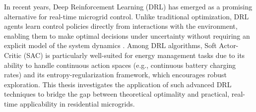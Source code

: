 In recent years, Deep Reinforcement Learning (DRL) has emerged as a promising alternative for real-time microgrid control. Unlike traditional optimization, DRL agents learn control policies directly from interactions with the environment, enabling them to make optimal decisions under uncertainty without requiring an explicit model of the system dynamics \cite{Mocanu2018, Li2019}. Among DRL algorithms, Soft Actor-Critic (SAC) \cite{Haarnoja2018} is particularly well-suited for energy management tasks due to its ability to handle continuous action spaces (e.g., continuous battery charging rates) and its entropy-regularization framework, which encourages robust exploration. This thesis investigates the application of such advanced DRL techniques to bridge the gap between theoretical optimality and practical, real-time applicability in residential microgrids.
